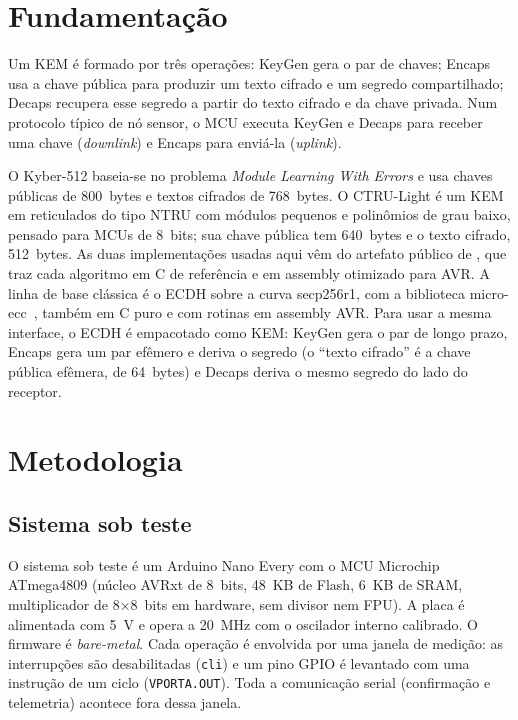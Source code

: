 \documentclass[acmsmall,nonacm,language=english,language=brazilian]{acmart}
\begin{document}
\section{Fundamentação}
\label{sec:fund}
Um KEM é formado por três operações: \textsf{KeyGen} gera o par de chaves;
\textsf{Encaps} usa a chave pública para produzir um texto cifrado e um
segredo compartilhado; \textsf{Decaps} recupera esse segredo a partir do texto
cifrado e da chave privada. Num protocolo típico de nó sensor, o MCU executa
\textsf{KeyGen} e \textsf{Decaps} para receber uma chave (\emph{downlink}) e
\textsf{Encaps} para enviá-la (\emph{uplink}).

O Kyber-512 baseia-se no problema \emph{Module Learning With Errors} e usa
chaves públicas de 800~bytes e textos cifrados de 768~bytes. O CTRU-Light é um
KEM em reticulados do tipo NTRU com módulos pequenos e polinômios de grau
baixo, pensado para MCUs de 8~bits; sua chave pública tem 640~bytes e o texto
cifrado, 512~bytes. As duas implementações usadas aqui vêm do artefato público
de \citet{ctruavr}, que traz cada algoritmo em C de referência e em assembly
otimizado para AVR. A linha de base clássica é o ECDH sobre a curva
secp256r1, com a biblioteca micro-ecc~\citep{microecc}, também em C puro e
com rotinas em assembly AVR. Para usar a mesma interface, o ECDH é
empacotado como KEM: \textsf{KeyGen} gera o par de longo prazo,
\textsf{Encaps} gera um par efêmero e deriva o segredo (o ``texto cifrado''
é a chave pública efêmera, de 64~bytes) e \textsf{Decaps} deriva o mesmo
segredo do lado do receptor.

\section{Metodologia}
\label{sec:met}

\subsection{Sistema sob teste}
O sistema sob teste é um Arduino Nano Every com o MCU Microchip ATmega4809
(núcleo AVRxt de 8~bits, 48~KB de Flash, 6~KB de SRAM, multiplicador de
8$\times$8~bits em hardware, sem divisor nem FPU). A placa é alimentada com
5~V e opera a 20~MHz com o oscilador interno calibrado. O firmware é
\emph{bare-metal}. Cada operação é envolvida por uma janela de medição: as
interrupções são desabilitadas (\texttt{cli}) e um pino GPIO é levantado com
uma instrução de um ciclo (\texttt{VPORTA.OUT}). Toda a comunicação serial
(confirmação e telemetria) acontece fora dessa janela.
\end{document}
